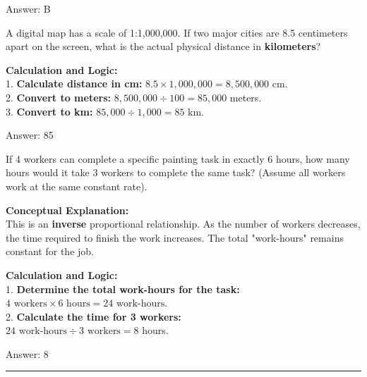 \documentclass[11pt,paper=a4,answers]{exam}
\begin{document}
\begin{questions}
\begin{solution}
\vspace{30pt}

Answer: \colorbox{yellow!100}{B}
\end{solution}

\vspace{60pt}

\question
A digital map has a scale of 1:1,000,000. If two major cities are 8.5 centimeters apart on the screen, what is the actual physical distance in \textbf{kilometers}?

\begin{solution}
\textbf{Calculation and Logic:} \\
1. \textbf{Calculate distance in cm:} $8.5 \times 1,000,000 = 8,500,000$ cm. \\
2. \textbf{Convert to meters:} $8,500,000 \div 100 = 85,000$ meters. \\
3. \textbf{Convert to km:} $85,000 \div 1,000 = 85$ km.

\vspace{30pt}

Answer: \colorbox{yellow!100}{85}
\end{solution}

\vspace{60pt}

\question
If 4 workers can complete a specific painting task in exactly 6 hours, how many hours would it take 3 workers to complete the same task? (Assume all workers work at the same constant rate).

\begin{solution}
\textbf{Conceptual Explanation:} \\
This is an \textbf{inverse} proportional relationship. As the number of workers decreases, the time required to finish the work increases. The total "work-hours" remains constant for the job.

\vspace{30pt}

\textbf{Calculation and Logic:} \\
1. \textbf{Determine the total work-hours for the task:} \\
$4 \text{ workers} \times 6 \text{ hours} = 24 \text{ work-hours}$. \\
2. \textbf{Calculate the time for 3 workers:} \\
$24 \text{ work-hours} \div 3 \text{ workers} = 8$ hours.

\vspace{30pt}

Answer: \colorbox{yellow!100}{8}
\end{solution}

\end{questions}
\begin{center}
\rule{.5\textwidth}{1pt}
\end{center}
\end{document}
